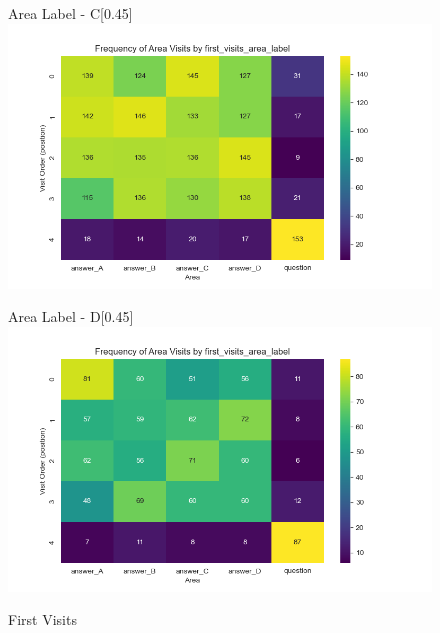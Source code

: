 \documentclass{article}
\begin{document}
\begin{figure}[H]
  \vspace{1em} %

  \begin{subcaptionbox}{Area Label - C\label{fig:al_c}}[0.45\textwidth]
    {\centering\includegraphics[width=\linewidth]{plots/visits/matrix__first_visits_area_label_hunters_C.png}}
  \end{subcaptionbox}
  \hfill
  \begin{subcaptionbox}{Area Label - D\label{fig:al_d}}[0.45\textwidth]
    {\centering\includegraphics[width=\linewidth]{plots/visits/matrix__first_visits_area_label_hunters_D.png}}
  \end{subcaptionbox}
  
  \caption{First Visits}
  \label{fig:fourimages1}
\end{figure}
\end{document}
